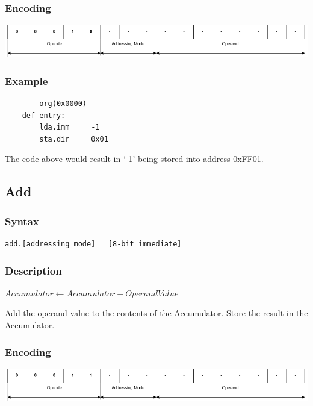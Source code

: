     \subsubsection{Encoding}
    \begin{center}
        \includegraphics[scale=0.40]{img/Andromeda-STA.drawio}
    \end{center}

    \subsubsection{Example}
    \begin{verbatim}
        org(0x0000)
    def entry:
        lda.imm     -1
        sta.dir     0x01
    \end{verbatim}
    \par The code above would result in `-1' being stored into address 0xFF01.

\pagebreak
\subsection{Add}\label{subsec:add}
    \subsubsection{Syntax}
    \begin{verbatim}add.[addressing mode]   [8-bit immediate]\end{verbatim}

    \subsubsection{Description}
    $Accumulator \leftarrow Accumulator + OperandValue$
    \par Add the operand value to the contents of the Accumulator.
    Store the result in the Accumulator.

    \subsubsection{Encoding}
    \begin{center}
        \includegraphics[scale=0.40]{img/Andromeda-ADD.drawio}
    \end{center}

